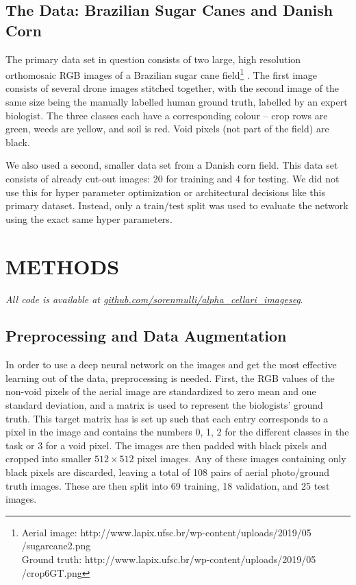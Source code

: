 \documentclass{article}
\begin{document}
\subsection{The Data: Brazilian Sugar Canes and Danish Corn}
The primary data set in question consists of two large, high resolution orthomosaic RGB images of a Brazilian sugar cane field\footnote{Aerial image: http://www.lapix.ufsc.br/wp-content/uploads/2019/05\\/sugarcane2.png\\
Ground truth: http://www.lapix.ufsc.br/wp-content/uploads/2019/05\\/crop6GT.png} \cite{brazil}.
The first image consists of several drone images stitched together, with the second image of the same size being the manually labelled human ground truth, labelled by an expert biologist.
The three classes each have a corresponding colour -- crop rows are green, weeds are yellow, and soil is red.
Void pixels (not part of the field) are black.

We also used a second, smaller data set from a Danish corn field. This data set consists of already cut-out images: 20 for training and 4 for testing.
We did not use this for hyper parameter optimization or architectural decisions like this primary dataset.
Instead, only a train/test split was used to evaluate the network using the exact same hyper parameters. 





\section{METHODS}
\label{sec:format}
\textit{All code is available at \url{github.com/sorenmulli/alpha_cellari_imageseg}}.
\subsection{Preprocessing and Data Augmentation}
In order to use a deep neural network on the images and get the most effective learning out of the data, preprocessing is needed.
First, the RGB values of the non-void pixels of the aerial image are standardized to zero mean and one standard deviation, and a matrix is used to represent the biologists' ground truth.
This target matrix has is set up such that each entry corresponds to a pixel in the image and contains the numbers 0, 1, 2 for the different classes in the task or 3 for a void pixel.
The images are then padded with black pixels and cropped into smaller $ 512\times 512 $ pixel images.
Any of these images containing only black pixels are discarded, leaving a total of 108 pairs of aerial photo/ground truth images.
These are then split into 69 training, 18 validation, and 25 test images.
\end{document}
